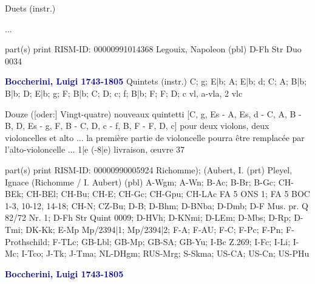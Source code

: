 \documentclass[twocolumn]{book}
\begin{document}
\newline Duets (instr.)    
\newline \begin{itshape}...\end{itshape} 
\newline \textcolor{darkblue}{}  part(s)  
\newline print
\newline RISM-ID: 00000991014368
\newline Legouix, Napoleon  (pbl)
\newline D-Fh  Str Duo 0034
\newline \par \vspace{7pt} \textcolor{darkblue}{\textbf{Boccherini, Luigi  1743-1805}}
\newline Quintets (instr.)  C; g; E|b; A; E|b; d; C; A; B|b; B|b; D; E|b; g; F; B|b; C; D; c; f; B|b; F; F; D; c  
 vl, a-vla, 2 vlc
\newline \begin{itshape}Douze ([oder:] Vingt-quatre) nouveaux quintetti [C, g, Es - A, Es, d - C, A, B - B, D, Es - g, F, B - C, D, c - f, B, F - F, D, c] pour deux violons, deux violoncelles et alto ... la première partie de violoncelle pourra être remplacée par l'alto-violoncelle ... 1|e (-8|e) livraison, œuvre 37\end{itshape} 
\newline \textcolor{darkblue}{}  part(s)  
\newline print
\newline RISM-ID: 00000990005924
\newline Richomme); (Aubert, I.  (prt)
\newline Pleyel, Ignace (Richomme / I. Aubert)  (pbl)
\newline A-Wgm; A-Wn; B-Ac; B-Br; B-Gc; CH-BEk; CH-BEl; CH-Bu; CH-E; CH-Gc; CH-Gpu; CH-LAc  FA 5 ONS 1; FA 5 BOC 1-3, 10-12, 14-18; CH-N; CZ-Bu; D-B; D-Bhm; D-BNba; D-Dmb; D-F  Mus. pr. Q 82/72 Nr. 1; D-Fh  Str Quint 0009; D-HVh; D-KNmi; D-LEm; D-Mbs; D-Rp; D-Tmi; DK-Kk; E-Mp  Mp/2394|1; Mp/2394|2; F-A; F-AU; F-C; F-Pc; F-Pn; F-Prothschild; F-TLc; GB-Lbl; GB-Mp; GB-SA; GB-Yu; I-Bc  Z.269; I-Fc; I-Li; I-Mc; I-Tco; J-Tk; J-Tma; NL-DHgm; RUS-Mrg; S-Skma; US-CA; US-Cn; US-PHu
\newline \par \vspace{7pt} \textcolor{darkblue}{\textbf{Boccherini, Luigi  1743-1805}}
\end{document}
